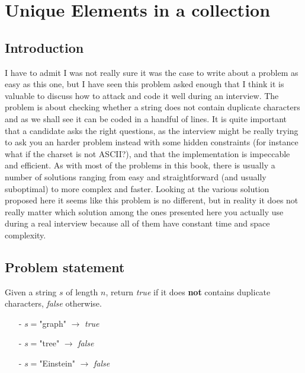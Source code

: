 %


\chapter{Unique Elements in a collection}
\label{ch:unique_elements}
\section*{Introduction}
I have to admit I was not really sure it was the case to write about a problem as easy as this one,
but I have seen this problem asked enough that I think it is valuable to discuss how to attack and
code it well during an interview. The problem is about checking whether a string does not contain
duplicate characters and as we shall see it can be coded in a handful of lines. It is quite
important that a candidate asks the right questions, as the interview might be really trying to ask
you an harder problem instead with some hidden constraints (for instance what if the charset is not
ASCII?), and that the implementation is impeccable and efficient. As with most of the problems in
this book, there is usually a number of solutions ranging from easy and straightforward (and usually
suboptimal) to more complex and faster. Looking at the various solution proposed here 
it seems like this problem is no different, but in reality it does not really matter which solution among the ones presented here
you actually use during a real interview because all of them have constant time and space complexity.


\section{Problem statement}
Given a string $s$ of length $n$, return \textit{true} if it does \textbf{not} contains duplicate characters, \textit{false} otherwise. 

\begin{example}
\hfill
	\begin{itemize}
		\item [-] $s=$"graph" $ \longrightarrow$ \textit{true}
		\item [-] $s=$"tree" $ \longrightarrow$ \textit{false}
		\item [-] $s=$"Einstein" $ \longrightarrow$ \textit{false}
	\end{itemize}
	
\end{example}

